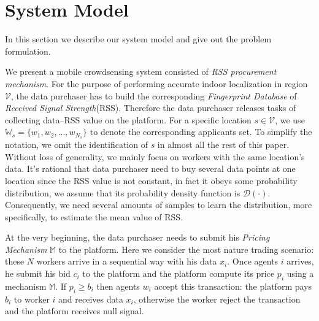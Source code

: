 \documentclass[10pt,conference,compsocconf,letterpaper]{IEEEtran}
\begin{document}

\section{System Model}\label{sysmodel}
In this section we describe our system model and give out the problem formulation.

We present a mobile crowdsensing system consisted of \emph{RSS procurement mechanism}. For the purpose of performing accurate indoor localization in region $\mathcal{V}$, the data purchaser has to build the corresponding \emph{Fingerprint Database} of \emph{Received Signal Strength}(RSS). Therefore the data purchaser releases tasks of collecting data--RSS value on the platform. For a specific location $s\in \mathcal{V}$, we use $\mathds{W}_s=\{w_1,w_2,...,w_{N_s}\}$ to denote the corresponding applicants set. To simplify the notation, we omit the identification of $s$ in almost all the rest of this paper. Without loss of generality, we mainly focus on workers with the same location's data. It's rational that data purchaser need to buy several data points at one location since the RSS value is not constant, in fact it obeys some probability distribution, we assume that its probability density function is $\mathcal{D}(\cdot)$. Consequently, we need several amounts of samples to learn the distribution, more specifically, to estimate the mean value of RSS.

At the very beginning, the data purchaser needs to submit his \emph{Pricing Mechanism} $\mathbb{M}$ to the platform. Here we consider the most nature trading scenario: these $N$ workers arrive in a sequential way with his data $x_i$. Once agents $i$ arrives, he submit his bid $c_i$ to the platform and the platform compute its price $p_i$ using a mechanism $\mathbb{M}$. If $p_i\geq b_i$ then agents $w_i$ accept this transaction: the platform pays $b_i$ to worker $i$ and receives data $x_i$, otherwise the worker reject the transaction and the platform receives null signal.
\begin{table}[h]
\caption{\textsc{Notations}} \label{tab:Notation}
\centering
{}
\end{table}
\end{document}

